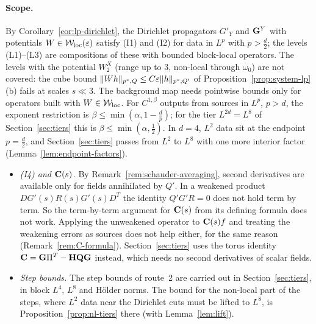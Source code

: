 \paragraph{Scope.} By Corollary~\ref{cor:lp-dirichlet}, the Dirichlet propagators $G'_Y$ and $\mathbf G^Y$ with potentials $W\in\mathcal W_{\rm loc}(\varepsilon)$ satisfy (I1) and (I2) for data in $L^p$ with $p>\frac d2$; the levels (L1)--(L3) are compositions of these with bounded block-local operators. The levels with the potential $W_2^X$ (range up to $3$, non-local through $\omega_0$) are not covered: the cube bound $\|Wh\|_{p^*,Q}\le C\varepsilon\|h\|_{p^*,Q'}$ of Proposition~\ref{prop:system-lp}(b) fails at scales $s\ll3$. The background map needs pointwise bounds only for operators built with $W\in\mathcal W_{\rm loc}$. For $C^{1,\beta}$ outputs from sources in $L^p$, $p>d$, the exponent restriction is $\beta\le\min(\alpha,1-\frac dp)$; for the tier $L^{2d}=L^8$ of Section~\ref{sec:tiers} this is $\beta\le\min(\alpha,\frac12)$. In $d=4$, $L^2$ data sit at the endpoint $p=\frac d2$, and Section~\ref{sec:tiers} passes from $L^2$ to $L^8$ with one more interior factor (Lemma~\ref{lem:endpoint-factors}).
\begin{itemize}
\item \emph{(I4) and $\mathbf C(s)$.} By Remark~\ref{rem:schauder-averaging}, second derivatives are available only for fields annihilated by $Q'$. In a weakened product $DG'(s)R(s)G'(s)D^T$ the identity $Q'G'R=0$ does not hold term by term. So the term-by-term argument for $\mathbf C(s)$ from its defining formula does not work. Applying the unweakened operator to $\mathbf C(s)f$ and treating the weakening errors as sources does not help either, for the same reason (Remark~\ref{rem:C-formula}). Section~\ref{sec:tiers} uses the torus identity $\mathbf C=\mathbf G\Pi^T-\mathbf H\mathbf Q\mathbf G$ instead, which needs no second derivatives of scalar fields.
\item \emph{Step bounds.} The step bounds of route~2 are carried out in Section~\ref{sec:tiers}, in block $L^4$, $L^8$ and H\"older norms. The bound for the non-local part of the steps, where $L^2$ data near the Dirichlet cuts must be lifted to $L^8$, is Proposition~\ref{prop:nl-tiers} there (with Lemma~\ref{lem:lift}).
\end{itemize}

